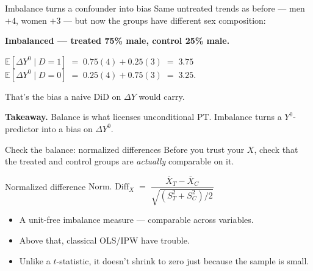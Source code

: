 \documentclass[aspectratio=169,11pt]{beamer}
\begin{document}
\begin{frame}{Imbalance turns a confounder into bias}
\vspace{0.4em}
Same untreated trends as before --- men $+4$, women $+3$ --- but now the groups have different sex composition:

\vspace{0.7em}
\textbf{Imbalanced --- treated 75\% male, control 25\% male.}
\vspace{0.3em}
\begin{center}
$\mathbb{E}[\Delta Y^0 \mid D{=}1] \;=\; 0.75(4) + 0.25(3) \;=\; 3.75$ \\[0.4em]
$\mathbb{E}[\Delta Y^0 \mid D{=}0] \;=\; 0.25(4) + 0.75(3) \;=\; 3.25.$
\end{center}

\vspace{0.6em}
 \;That's the bias a naive DiD on $\Delta Y$ would carry.

\vspace{0.6em}
\textbf{Takeaway.} \;Balance is what licenses unconditional PT. \;Imbalance turns a $Y^0$-predictor into a bias on $\Delta Y^0$.
\end{frame}

\begin{frame}{Check the balance: normalized differences}
\vspace{0.6em}
Before you trust your $X$, check that the treated and control groups are \textit{actually} comparable on it.
\vspace{0.6em}
\begin{block}{Normalized difference}
\centering
\large
$\text{Norm. Diff}_{X} \;=\; \dfrac{\overline{X}_T - \overline{X}_C}{\sqrt{(S^2_T + S^2_C)/2}}$
\end{block}
\vspace{0.6em}
\begin{itemize}\small
  \item A unit-free imbalance measure --- comparable across variables.
  \item {} \;Above that, classical OLS/IPW have trouble.
  \item Unlike a $t$-statistic, it doesn't shrink to zero just because the sample is small.
\end{itemize}
\end{frame}
\end{document}
